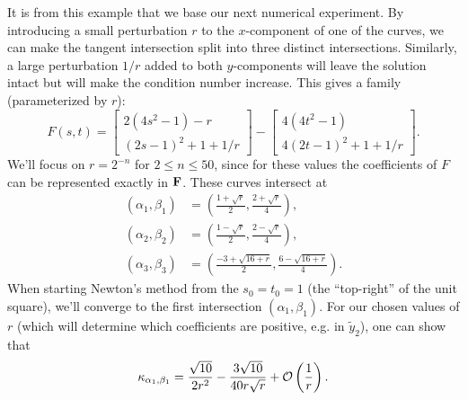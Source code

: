 It is from this example that we base our next numerical experiment. By
introducing a small perturbation \(r\) to the \(x\)-component of
one of the curves, we can make the tangent intersection split into three
distinct intersections. Similarly, a large perturbation \(1/r\) added to
both \(y\)-components will leave the solution intact but will make the
condition number increase. This gives a family (parameterized by \(r\)):
\begin{equation}
F(s, t) = \left[ \begin{array}{c} 2(4s^2 - 1) - r \\ (2s - 1)^2 + 1 + 1/r
\end{array}\right] - \left[ \begin{array}{c} 4(4t^2 - 1) \\
4(2t - 1)^2 + 1 + 1/r \end{array}\right].
\end{equation}
We'll focus on \(r = 2^{-n}\) for \(2 \leq n \leq 50\), since for these
values the coefficients of \(F\) can be represented exactly in
\(\mathbf{F}\). These curves intersect at
\begin{align}
(\alpha_1, \beta_1) &= \left(\frac{1 + \sqrt{r}}{2},
  \frac{2 + \sqrt{r}}{4}\right), \\
(\alpha_2, \beta_2) &= \left(\frac{1 - \sqrt{r}}{2},
  \frac{2 - \sqrt{r}}{4}\right), \\
(\alpha_3, \beta_3) &= \left(\frac{-3 + \sqrt{16 + r}}{2},
  \frac{6 - \sqrt{16 + r}}{4}\right).
\end{align}
When starting Newton's method from the \(s_0 = t_0 = 1\) (the ``top-right''
of the unit square), we'll converge to the first intersection
\((\alpha_1, \beta_1)\). For our chosen values of \(r\) (which will
determine which coefficients are positive, e.g. in \(\widetilde{y}_2\)),
one can show that
\begin{equation}
\kappa_{\alpha_1, \beta_1} = \frac{\sqrt{10}}{2r^2} -
  \frac{3 \sqrt{10}}{40 r \sqrt{r}} + \mathcal{O}\left(\frac{1}{r}\right).
\end{equation}

